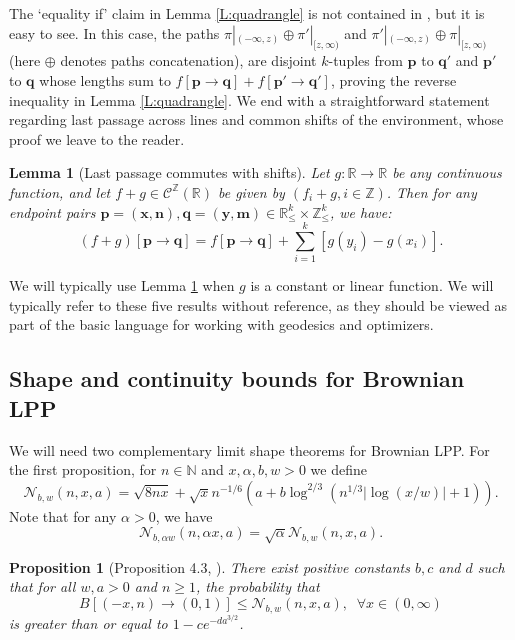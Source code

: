 \documentclass[11pt]{article}
\newcommand{\Z}{\mathbb{Z}}
\newcommand{\N}{\mathbb{N}}
\newcommand{\R}{\mathbb{R}}
\newcommand{\al}{\alpha}
\newcommand{\cC}{\mathcal{C}}
\newcommand{\cN}{\mathcal{N}}
\newcommand{\X}{\times}
\newcommand{\bx}{\mathbf{x}}
\newcommand{\bn}{\mathbf{n}}
\newcommand{\bm}{\mathbf{m}}
\newcommand{\by}{\mathbf{y}}
\newcommand{\bp}{\mathbf{p}}
\newcommand{\bq}{\mathbf{q}}
\newtheorem{lemma}[theorem]{Lemma}
\newtheorem{proposition}[theorem]{Proposition}
\theoremstyle{definition} %
\theoremstyle{remark} %
\begin{document}
The `equality if' claim in Lemma \ref{L:quadrangle} is not contained in \cite{dauvergne2021disjoint}, but it is easy to see. In this case, the paths $\pi|_{(-\infty, z)} \oplus \pi'|_{[z, \infty)}$ and $\pi'|_{(-\infty, z)} \oplus \pi|_{[z, \infty)}$ (here $\oplus$ denotes paths concatenation), are disjoint $k$-tuples from $\bp$ to $\bq'$ and $\bp'$ to $\bq$ whose lengths sum to $f[\bp \to \bq] + f[\bp' \to \bq']$, proving the reverse inequality in Lemma \ref{L:quadrangle}. We end with a straightforward statement regarding last passage across lines and common shifts of the environment, whose proof we leave to the reader. 

\begin{lemma}[Last passage commutes with shifts]
	\label{L:shift-commute}
	Let $g:\R \to \R$ be any continuous function, and let $f + g \in \cC^\Z(\R)$ be given by $(f_i + g, i \in \Z)$. Then for any endpoint pairs $\bp = (\bx, \bn), \bq = (\by, \bm) \in \R^k_\le \X \Z^k_\le$, we have:
	$$
	(f+g)[\bp \to \bq] = f[\bp \to \bq] + \sum_{i=1}^k [g(y_i) - g(x_i)].
	$$
\end{lemma}
We will typically use Lemma \ref{L:shift-commute} when $g$ is a constant or linear function. We will typically refer to these five results without reference, as they should be viewed as part of the basic language for working with geodesics and optimizers. 


\subsection{Shape and continuity bounds for Brownian LPP}

We will need two complementary limit shape theorems for Brownian LPP. For the first proposition, for $n \in \N$ and $x, \al, b, w > 0$ we define
\[
\cN_{b,w}(n,x,a)=
\sqrt{8 nx} + \sqrt{x} n^{-1/6}(a + b\log^{2/3}(n^{1/3} |\log(x/w)| + 1)).
\]
Note that for any $\alpha>0$, we have
\begin{equation} \label{eq:rescale-cN}
	\cN_{b,\alpha w}(n,\alpha x,a) = \sqrt{\alpha}\cN_{b,w}(n,x,a).
\end{equation}
\begin{proposition}[Proposition 4.3, \cite{dauvergne2021bulk}]
	\label{P:cross-prob}
	There exist positive constants $b, c$ and $d$ such that for all $w,a > 0$ and $n \ge 1$, the probability that
	\[
	B[(-x, n) \to (0, 1)] \le \cN_{b,w}(n,x,a), \;\; \forall x \in (0, \infty)
	\]
	is greater than or equal to $1- c e^{-d a^{3/2}}$.
\end{proposition}
\end{document}
